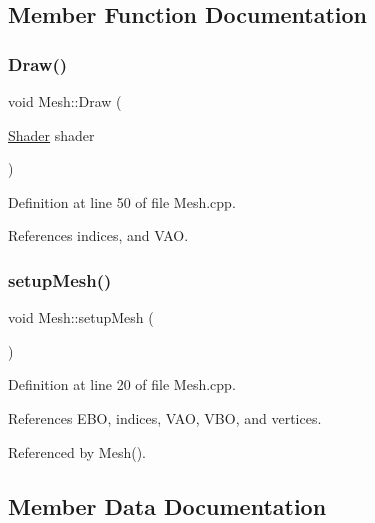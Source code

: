\subsection{Member Function Documentation}
\mbox{\label{classMesh_a143c8d7c179801c6377853db26d4a19f}} 
\subsubsection{\texorpdfstring{Draw()}{Draw()}}
{\footnotesize\ttfamily void Mesh\+::\+Draw (\begin{DoxyParamCaption}\item[{\mbox{\hyperlink{classShader}{Shader}}}]{shader }\end{DoxyParamCaption})}



Definition at line 50 of file Mesh.\+cpp.



References indices, and V\+AO.

\mbox{\label{classMesh_aafa4e21067a9b0c4407daf5e3c9ea991}} 
\subsubsection{\texorpdfstring{setup\+Mesh()}{setupMesh()}}
{\footnotesize\ttfamily void Mesh\+::setup\+Mesh (\begin{DoxyParamCaption}{ }\end{DoxyParamCaption})\hspace{0.3cm}{\ttfamily [private]}}



Definition at line 20 of file Mesh.\+cpp.



References E\+BO, indices, V\+AO, V\+BO, and vertices.



Referenced by Mesh().



\subsection{Member Data Documentation}
\mbox{\label{classMesh_a894c6723c0172f4e38b2509582abfa6c}} 
